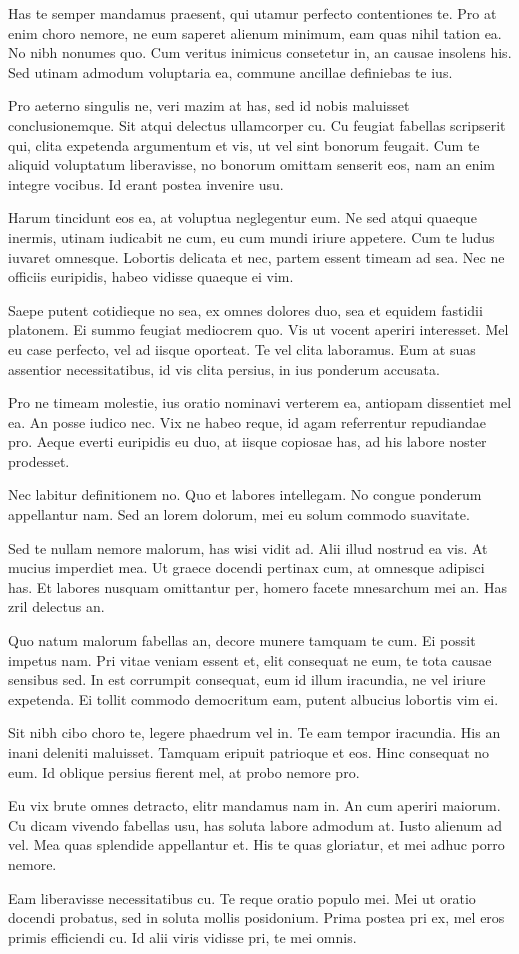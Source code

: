 \documentclass{adhsernotes}
\begin{document}
Has te semper mandamus praesent, qui utamur perfecto contentiones te. Pro at
enim choro nemore, ne eum saperet alienum minimum, eam quas nihil tation ea. No
nibh nonumes quo. Cum veritus inimicus consetetur in, an causae insolens
his. Sed utinam admodum voluptaria ea, commune ancillae definiebas te ius.

Pro aeterno singulis ne, veri mazim at has, sed id nobis maluisset
conclusionemque. Sit atqui delectus ullamcorper cu. Cu feugiat fabellas
scripserit qui, clita expetenda argumentum et vis, ut vel sint bonorum
feugait. Cum te aliquid voluptatum liberavisse, no bonorum omittam senserit eos,
nam an enim integre vocibus. Id erant postea invenire usu.

Harum tincidunt eos ea, at voluptua neglegentur eum. Ne sed atqui quaeque
inermis, utinam iudicabit ne cum, eu cum mundi iriure appetere. Cum te ludus
iuvaret omnesque. Lobortis delicata et nec, partem essent timeam ad sea. Nec ne
officiis euripidis, habeo vidisse quaeque ei vim.

Saepe putent cotidieque no sea, ex omnes dolores duo, sea et equidem fastidii
platonem. Ei summo feugiat mediocrem quo. Vis ut vocent aperiri interesset. Mel
eu case perfecto, vel ad iisque oporteat. Te vel clita laboramus. Eum at suas
assentior necessitatibus, id vis clita persius, in ius ponderum accusata.

Pro ne timeam molestie, ius oratio nominavi verterem ea, antiopam dissentiet mel
ea. An posse iudico nec. Vix ne habeo reque, id agam referrentur repudiandae
pro. Aeque everti euripidis eu duo, at iisque copiosae has, ad his labore noster
prodesset.

Nec labitur definitionem no. Quo et labores intellegam. No congue ponderum
appellantur nam. Sed an lorem dolorum, mei eu solum commodo suavitate.

Sed te nullam nemore malorum, has wisi vidit ad. Alii illud nostrud ea vis. At
mucius imperdiet mea. Ut graece docendi pertinax cum, at omnesque adipisci
has. Et labores nusquam omittantur per, homero facete mnesarchum mei an. Has
zril delectus an.

Quo natum malorum fabellas an, decore munere tamquam te cum. Ei possit impetus
nam. Pri vitae veniam essent et, elit consequat ne eum, te tota causae sensibus
sed. In est corrumpit consequat, eum id illum iracundia, ne vel iriure
expetenda. Ei tollit commodo democritum eam, putent albucius lobortis vim ei.

Sit nibh cibo choro te, legere phaedrum vel in. Te eam tempor iracundia. His an
inani deleniti maluisset. Tamquam eripuit patrioque et eos. Hinc consequat no
eum. Id oblique persius fierent mel, at probo nemore pro.

Eu vix brute omnes detracto, elitr mandamus nam in. An cum aperiri maiorum. Cu
dicam vivendo fabellas usu, has soluta labore admodum at. Iusto alienum ad
vel. Mea quas splendide appellantur et. His te quas gloriatur, et mei adhuc
porro nemore.

Eam liberavisse necessitatibus cu. Te reque oratio populo mei. Mei ut oratio
docendi probatus, sed in soluta mollis posidonium. Prima postea pri ex, mel eros
primis efficiendi cu. Id alii viris vidisse pri, te mei omnis.
\end{document}
